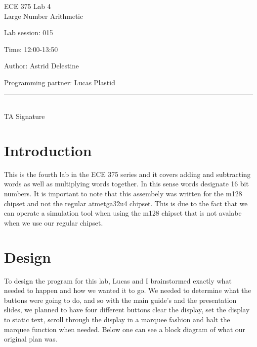 \documentclass[12pt,letterpaper]{article}
\begin{document}
\begin{titlepage}
    \vspace*{4cm}
    \begin{flushright}
    {\huge
        ECE 375 Lab 4\\[1cm]
    }
    {\large
    	Large Number Arithmetic
    }
    \end{flushright}
    \begin{flushleft}
    Lab session: 015
    
    Time: 12:00-13:50
    \end{flushleft}
    \begin{flushright}
    Author: Astrid Delestine

    Programming partner: Lucas Plastid 

    \vfill
    \rule{5in}{.5mm}\\
    TA Signature
    \end{flushright}

\end{titlepage}

\section{Introduction}
This is the fourth lab in the ECE 375 series and it covers adding and subtracting words as well as multiplying words together. In this sense words designate 16 bit numbers. It is important to note that this assembely was written for the m128 chipset and not the regular atmetga32u4 chipset. This is due to the fact that we can operate a simulation tool when using the m128 chipset that is not avalabe when we use our regular chipset.

\section{Design}
To design the program for this lab, Lucas and I brainstormed exactly what needed to happen and how we wanted it to go. We needed to determine what the buttons were going to do, and so with the main guide's and the presentation slides, we planned to have four different buttons clear the display, set the display to static text, scroll through the display in a marquee fashion and halt the marquee function when needed. Below one can see a block diagram of what our original plan was.
\end{document}
